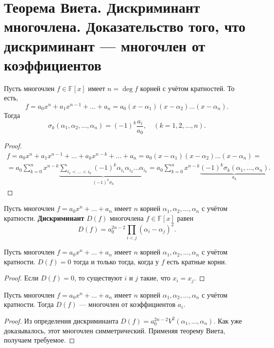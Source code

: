 \section{Теорема Виета. Дискриминант многочлена. Доказательство того, что дискриминант --- многочлен от коэффициентов}

\begin{theorem}[Виет]
    Пусть многочлен $f \in \mathbb{F}[x]$ имеет $n = \deg f$ корней с учётом кратностей. То есть,
    $$
    f = a_0x^n + a_1x^{n - 1} + \ldots + a_n = a_0(x - \alpha_1)(x - \alpha_2)\ldots(x - \alpha_n).
    $$
    Тогда
    $$
    \sigma_k(\alpha_1, \alpha_2, \ldots, \alpha_n) = (-1)^k\frac{a_i}{a_0},\quad(k = 1, 2, \ldots, n).
    $$
\end{theorem}

\begin{proof}
    $$
    \begin{array}{c}\displaystyle
        f = a_0x^n + a_1x^{n - 1} + \ldots + a_kx^{n - k} + \ldots + a_n = 
        a_0(x - \alpha_1)(x - \alpha_2)\ldots(x - \alpha_n) =\\\displaystyle
        = a_0\sum_{k = 0}^nx^{n - k}\underbrace{\sum_{i_1 < \ldots < i_k}(-1)^k\alpha_{i_1}\alpha_{i_2}\ldots\alpha_{i_k}}_{(-1)^k\sigma_k} = 
        a_0\sum_{k = 0}^nx^{n - k}\underbrace{(-1)^k\sigma_k(\alpha_1, \ldots, \alpha_n)}_{a_k}.
    \end{array}
    $$
\end{proof}

\begin{definition}
    Пусть многочлен $f = a_0x^n + \ldots + a_n$ имеет $n$ корней $\alpha_1, \alpha_2, \ldots, \alpha_n$ с учётом кратности. \textbf{Дискриминант} $D(f)$ многочлена $f \in \mathbb{F}[x]$ равен
    $$
    D(f) = a_0^{2n - 2}\prod_{i < j}(\alpha_i - \alpha_j)^2.
    $$
\end{definition}

\begin{theorem}
    Пусть многочлен $f = a_0x^n + \ldots + a_n$ имеет $n$ корней $\alpha_1, \alpha_2, \ldots, \alpha_n$ с учётом кратности. $D(f) = 0$ тогда и только тогда, когда у $f$ есть кратные корни.
\end{theorem}

\begin{proof}
    Если $D(f) = 0$, то существуют $i$ и $j$ такие, что $x_i = x_j$.
\end{proof}

\begin{theorem}
    Пусть многочлен $f = a_0x^n + \ldots + a_n$ имеет $n$ корней $\alpha_1, \alpha_2, \ldots, \alpha_n$ с учётом кратности. Тогда $D(f)$ --- многочлен от коэффициентов $a_i$.
\end{theorem}

\begin{proof}
    Из определения дискриминанта $D(f) = a_0^{2n - 2}V^2(\alpha_1, \ldots, \alpha_n)$. Как уже доказывалось, этот многочлен симметрический. Применяя теорему Виета, получаем требуемое.
\end{proof}


